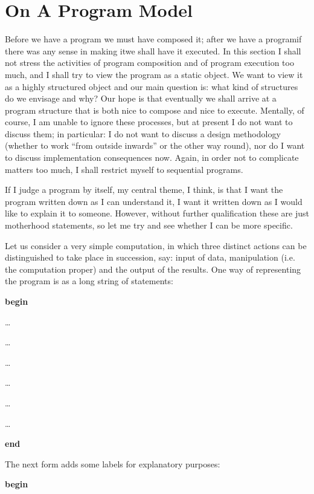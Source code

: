\section[On a program model]{On A Program Model}
\label{eq:program-model}

Before we have a program we must have composed it; after we have a program\textemdash{}if there was any sense in making it\textemdash{}we shall have it executed. In this section I shall not stress the activities of program composition and of program execution too much, and I shall try to view the program as a static object. We want to view it as a highly structured object and our main question is: what kind of structures do we envisage and why? Our hope is that eventually we shall arrive at a program structure that is both nice to compose and nice to execute. Mentally, of course, I am unable to ignore these processes, but at present I do not want to discuss them; in particular: I do not want to discuss a design methodology (whether to work ``from outside inwards'' or the other way round), nor do I want to discuss implementation consequences now. Again, in order not to complicate matters too much, I shall restrict myself to sequential programs.

If I judge a program by itself, my central theme, I think, is that I want the program written down as I can understand it, I want it written down as I would like to explain it to someone. However, without further qualification these are just motherhood statements, so let me try and see whether I can be more specific.

Let us consider a very simple computation, in which three distinct actions can be distinguished to take place in succession, say: input of data, manipulation (i.e. the computation proper) and the output of the results. One way of representing the program is as a long string of statements:

\noindent
\textbf{begin}

\noindent
\quad\dots

\noindent
\quad\dots

\noindent
\quad\dots

\noindent
\quad\dots

\noindent
\quad\dots

\noindent
\quad\dots

\noindent
\textbf{end}

The next form adds some labels for explanatory purposes:

\noindent
\tabto{10em}\textbf{begin}
\nopagebreak

